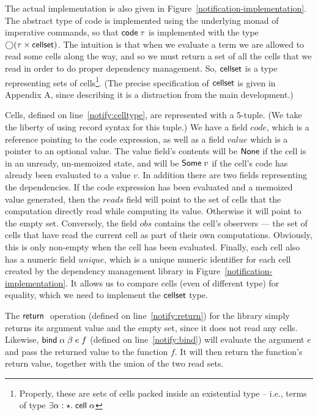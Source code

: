 \documentclass[preprint,natbib]{sigplanconf}
\begin{document}
The actual implementation is also given in
Figure~\ref{notification-implementation}. The abstract type of code is
implemented using the underlying monad of imperative commands, so that
$\mbox{\textsf{{code}}}\;{\tau}$ is implemented with the type $\bigcirc{(\tau \times
  \mbox{\textsf{{cellset}}})}$.  The intuition is that when we evaluate a term we are
allowed to read some cells along the way, and so we must return a set of
all the cells that we read in order to do proper dependency
management. So, $\mbox{\textsf{{cellset}}}$ is a type representing sets of
cells\footnote{Properly, these are sets of cells packed inside an
  existential type -- i.e., terms of type $\exists \alpha:\star.\;
  \mbox{\textsf{{cell}}}\;{\alpha}$}. (The precise specification of $\mbox{\textsf{{cellset}}}$ is
given in Appendix A, since describing it is a distraction from the
main development.)

Cells, defined on line~\ref{notify:celltype}, are represented with a
5-tuple. (We take the liberty of using record syntax for this tuple.)
We have a field $code$, which is a reference pointing to the code
expression, as well as a field $value$ which is a pointer to an
optional value. The value field's contents will be $\mbox{\textsf{{None}}}$ if
the cell is in an unready, un-memoized state, and will be
$\mbox{\textsf{{Some}}}\;v$ if the cell's code has already been evaluated to a
value $v$. In addition there are two fields representing the
dependencies. If the code expression has been evaluated and a memoized
value generated, then the $reads$ field will point to the set of cells
that the computation directly read while computing its
value. Otherwise it will point to the empty set. Conversely, the field
$obs$ contains the cell's observers --- the set of cells that have
read the current cell as part of their own computations. Obviously,
this is only non-empty when the cell has been evaluated. Finally, each
cell also has a numeric field $unique$, which is a unique numeric
identifier for each cell created by the dependency management library
in Figure~\ref{notification-implementation}. It allows us to compare
cells (even of different type) for equality, which we need to
implement the $\mbox{\textsf{{cellset}}}$ type.

The $\mbox{\textsf{{return}}}\;$ operation (defined on line~\ref{notify:return}) for the
library simply returns its argument value and the empty set, since it
does not read any cells. Likewise, $\mbox{\textsf{{bind}}}\; \alpha\;\beta\;e\;f$ (defined on
line~\ref{notify:bind}) will evaluate the argument $e$ and pass the
returned value to the function $f$. It will then return the function's
return value, together with the union of the two read sets. 
\end{document}
